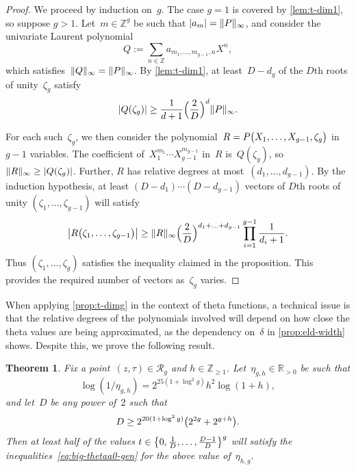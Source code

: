 \documentclass[12pt,oneside]{amsart}
\numberwithin{equation}{section}
\newtheorem{thm}[equation]{Theorem}
\theoremstyle{definition}
\newcommand{\Z}{\mathbb{Z}}
\newcommand{\R}{\mathbb{R}}
\newcommand{\red}{\mathcal{R}}
\DeclarePairedDelimiter{\abs}{|}{|}
\DeclarePairedDelimiter{\paren}{(}{)}
\DeclarePairedDelimiter{\norm}{\|}{\|}
\DeclarePairedDelimiter{\set}{\{}{\}}
\begin{document}
\begin{proof}
  We proceed by induction on~$g$. The case $g=1$ is covered by
  \cref{lem:t-dim1}, so suppose $g>1$. Let~$m\in \Z^g$ be such that
  $\abs{a_m} = \norm{P}_\infty$, and consider the univariate Laurent polynomial
  \begin{displaymath}
    Q := \sum_{n\in \Z} a_{m_1,\ldots,m_{g-1}, n} X^n,
  \end{displaymath}
  which satisfies~$\norm{Q}_\infty = \norm{P}_\infty$.  By \cref{lem:t-dim1},
  at least~$D - d_g$ of the $D$th roots of unity~$\zeta_g$ satisfy
  \begin{displaymath}
    \abs{Q(\zeta_g)}\geq \frac{1}{d+1} \paren[\Big]{\frac{2}{D}}^{d} \norm{P}_\infty.
  \end{displaymath}

  For each such~$\zeta_g$, we then consider the
  polynomial~$R = P \paren[\big]{X_1,\ldots,X_{g-1}, \zeta_g}$ in $g-1$
  variables. The coefficient of~$X_1^{m_1}\cdots X_{g-1}^{m_{g-1}}$ in~$R$
  is~$Q(\zeta_g)$, so $\norm{R}_\infty\geq \abs{Q(\zeta_g)}$. Further, $R$ has
  relative degrees at most~$(d_1,\ldots,d_{g-1})$. By the induction hypothesis,
  at least $(D-d_1)\cdots(D-d_{g-1})$ vectors of $D$th roots of unity
  $(\zeta_1,\ldots,\zeta_{g-1})$ will satisfy
  \begin{displaymath}
    \abs[\big]{R\paren[\big]{\zeta_1,\ldots,\zeta_{g-1}}} \geq \norm{R}_\infty
    \paren[\Big]{\frac{2}{D}}^{d_1+\ldots+d_{g-1}} \prod_{i=1}^{g-1} \frac{1}{d_i+1}.
  \end{displaymath}
  Thus $(\zeta_1,\ldots,\zeta_g)$ satisfies the inequality claimed in the
  proposition. This provides the required number of vectors as~$\zeta_g$ varies.
\end{proof}

When applying \cref{prop:t-dimg} in the context of theta functions, a technical
issue is that the relative degrees of the polynomials involved will depend on
how close the theta values are being approximated, as the dependency
on~$\delta$ in \cref{prop:eld-width} shows.  Despite this, we prove the
following result.

\begin{thm}
  \label{thm:choose-t}
  Fix a point~$(z,\tau)\in \red_g$ and $h\in \Z_{\geq
    1}$. Let~$\eta_{g,h}\in \R_{>0}$ be such that
  \begin{displaymath}
    \log(1/\eta_{g,h}) = 2^{25(1+\log^2 g)}h^2 \log(1+h),
  \end{displaymath}
  and let~$D$ be any power of~$2$ such that
  \begin{displaymath}
    D\geq 2^{20(1+\log^2 g)}\paren[\big]{2^{2g} + 2^{g+h}}.
  \end{displaymath}
  Then at least half of the values $t\in \set[\big]{0, \tfrac 1D,\ldots,\tfrac{D-1}{D}}^g$ will satisfy
  the inequalities~\eqref{eq:big-thetaa0-gen} for the above value
  of~$\eta_{h,g}$.
\end{thm}
\end{document}
